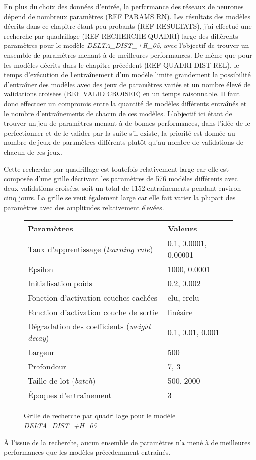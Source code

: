 
\par En plus du choix des données d'entrée, la performance des réseaux de neurones dépend de nombreux paramètres (REF PARAMS RN). Les résultats des modèles décrits dans ce chapitre étant peu probants (REF RESULTATS), j'ai effectué une recherche par quadrillage (REF RECHERCHE QUADRI) large des différents paramètres pour le modèle \emph{DELTA\_DIST\_+H\_05}, avec l'objectif de trouver un ensemble de paramètres menant à de meilleures performances. De même que pour les modèles décrits dans le chapitre précédent (REF QUADRI DIST REL), le temps d'exécution de l'entraînement d'un modèle limite grandement la possibilité d'entraîner des modèles avec des jeux de paramètres variés et un nombre élevé de validations croisées (REF VALID CROISEE) en un temps raisonnable. Il faut donc effectuer un compromis entre la quantité de modèles différents entraînés et le nombre d'entraînements de chacun de ces modèles. L'objectif ici étant de trouver un jeu de paramètres menant à de bonnes performances, dans l'idée de le perfectionner et de le valider par la suite s'il existe, la priorité est donnée au nombre de jeux de paramètres différents plutôt qu'au nombre de validations de chacun de ces jeux.

\par Cette recherche par quadrillage est toutefois relativement large car elle est composée d'une grille décrivant les paramètres de 576 modèles différents avec deux validations croisées, soit un total de 1152 entraînements pendant environ cinq jours. La grille se veut également large car elle fait varier la plupart des paramètres avec des amplitudes relativement élevées.

\begin{figure}
	\centering
	
	\begin{tabular}{|l|l|}
		\hline
		\textbf{Paramètres} & \textbf{Valeurs} \\ \hline 
		Taux d'apprentissage (\textit{learning rate}) & 0.1, 0.0001, 0.00001 \\ \hline
		Epsilon & 1000, 0.0001 \\ \hline
		Initialisation poids & 0.2, 0.002 \\ \hline
		Fonction d'activation couches cachées & elu, crelu \\ \hline
		Fonction d'activation couche de sortie & linéaire \\ \hline
		Dégradation des coefficients (\textit{weight decay}) & 0.1, 0.01, 0.001 \\ \hline
		Largeur & 500 \\ \hline
		Profondeur & 7, 3 \\ \hline
		Taille de lot (\textit{batch}) & 500, 2000\\ \hline
		Époques d'entraînement & 3 \\ \hline
		
	\end{tabular}		
	
	\caption{Grille de recherche par quadrillage pour le modèle \emph{DELTA\_DIST\_+H\_05}}
\end{figure}

\par À l'issue de la recherche, aucun ensemble de paramètres n'a mené à de meilleures performances que les modèles précédemment entraînés.
